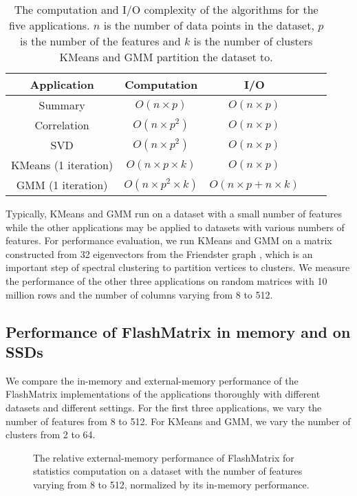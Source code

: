\begin{table}
\begin{center}
\footnotesize
\begin{tabular}{|c|c|c|c|c|}
\hline
Application & Computation & I/O \\
\hline
Summary & $O(n \times p)$ & $O(n \times p)$ \\
\hline
Correlation & $O(n \times p^2)$ & $O(n \times p)$ \\
\hline
SVD & $O(n \times p^2)$ & $O(n \times p)$ \\
\hline
KMeans (1 iteration) & $O(n \times p \times k)$ & $O(n \times p)$ \\
\hline
GMM (1 iteration) & $O(n \times p^2 \times k)$ & $O(n \times p + n \times k)$ \\
\hline
\end{tabular}
\normalsize
\end{center}
\caption{The computation and I/O complexity of the algorithms for the five
	applications. $n$ is the number of data points in the dataset, $p$ is
	the number of the features and $k$ is the number of clusters KMeans and
GMM partition the dataset to.}
\label{tbl:algs}
\end{table}

Typically, KMeans and GMM run on a dataset with a small number of features
while the other applications may be applied to datasets with various numbers
of features. For performance evaluation, we run KMeans and GMM on a matrix
constructed from 32 eigenvectors from the Friendster graph \cite{friendster},
which is
an important step of spectral clustering \cite{} to partition vertices to
clusters. We measure the performance of the other three applications on
random matrices with 10 million rows and the number of columns varying
from 8 to 512.

\subsection{Performance of FlashMatrix in memory and on SSDs}

We compare the in-memory and external-memory performance of the FlashMatrix
implementations of the applications thoroughly with different datasets and
different settings. For the first three applications, we vary the number of
features from 8 to 512. For KMeans and GMM, we vary the number of clusters
from 2 to 64.

\begin{figure}
	\begin{center}
		\footnotesize
		
		\caption{The relative external-memory performance of FlashMatrix for
			statistics computation on a dataset with the number of features
		varying from 8 to 512, normalized by its in-memory performance.}
		\label{perf:stat}
	\end{center}
\end{figure}

